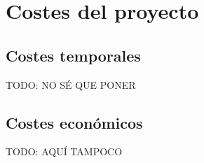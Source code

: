 \documentclass[../all.tex]{subfiles}
\begin{document}
\section{Costes del proyecto} 

\subsection{Costes temporales} 
	{\color{red} 
		TODO: NO SÉ QUE PONER\\
	}

\subsection{Costes económicos} 
	{\color{red} 
		TODO: AQUÍ TAMPOCO\\
	}
\end{document}
